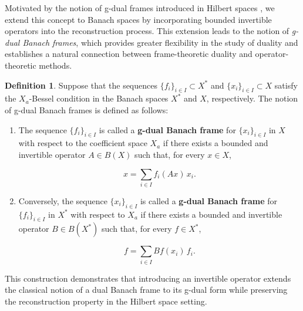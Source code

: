 \documentclass[12pt]{article}
\theoremstyle{definition}
\newtheorem{definition}[theorem]{Definition}
\theoremstyle{remark}
\begin{document}
Motivated by the notion of g-dual frames introduced in Hilbert spaces \cite{Dehghan2013}, we extend this concept to Banach spaces by incorporating bounded invertible operators into the reconstruction process. This extension leads to the notion of \textit{g-dual Banach frames}, which provides greater flexibility in the study of duality and establishes a natural connection between frame-theoretic duality and operator-theoretic methods.



\begin{definition}
	Suppose that the sequences \(\{f_i\}_{i \in I} \subset X^*\) and \(\{x_i\}_{i \in I} \subset X\) satisfy the \(X_a\)-Bessel condition in the Banach spaces \(X^*\) and \(X\), respectively. The notion of g-dual Banach frames is defined as follows:
	
	\begin{enumerate}
		\item The sequence \(\{f_i\}_{i \in I}\) is called a \textbf{g-dual Banach frame} for \(\{x_i\}_{i \in I}\) in \(X\) with respect to the coefficient space \(X_a\) if there exists a bounded and invertible operator \(A \in B(X)\) such that, for every \(x \in X\),
		
		$$
		x = \sum_{i \in I} f_i(Ax) \, x_i.
		$$
		
		\item Conversely, the sequence \(\{x_i\}_{i \in I}\) is called a \textbf{g-dual Banach frame} for \(\{f_i\}_{i \in I}\) in \(X^*\) with respect to \(X_a\) if there exists a bounded and invertible operator \(B \in B(X^*)\) such that, for every \(f \in X^*\),
		
		$$
		f = \sum_{i \in I} Bf(x_i) \, f_i.
		$$
		
	\end{enumerate}
\end{definition}

This construction demonstrates that introducing an invertible operator extends the classical notion of a dual Banach frame to its g-dual form while preserving the reconstruction property in the Hilbert space setting.
\end{document}

